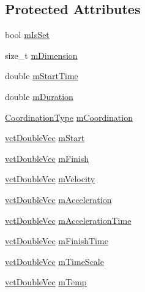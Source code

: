 \subsection*{Protected Attributes}
\begin{DoxyCompactItemize}
\item 
bool \hyperlink{classrob_l_s_p_b_a754306ed9e75319fdd5752dc564b1b85}{m\+Is\+Set}
\item 
size\+\_\+t \hyperlink{classrob_l_s_p_b_a2975b72bfeba86d33010dd9ea987ef3b}{m\+Dimension}
\item 
double \hyperlink{classrob_l_s_p_b_a8116b0fac995bf253c0f701c7ab7a00b}{m\+Start\+Time}
\item 
double \hyperlink{classrob_l_s_p_b_a79217b19223e3b08ca514250ce67bc4d}{m\+Duration}
\item 
\hyperlink{classrob_l_s_p_b_a8feec61f7c94670dbdbe75e63dec8496}{Coordination\+Type} \hyperlink{classrob_l_s_p_b_ade268d2bf36ea69e308acc6e60eeca91}{m\+Coordination}
\item 
\hyperlink{vct_dynamic_vector_types_8h_ade4b3068c86fb88f41af2e5187e491c2}{vct\+Double\+Vec} \hyperlink{classrob_l_s_p_b_ab1ad2d98754f2e0461f7853997293ea5}{m\+Start}
\item 
\hyperlink{vct_dynamic_vector_types_8h_ade4b3068c86fb88f41af2e5187e491c2}{vct\+Double\+Vec} \hyperlink{classrob_l_s_p_b_add5bdcfe3d89555a15bb2741c63ade5a}{m\+Finish}
\item 
\hyperlink{vct_dynamic_vector_types_8h_ade4b3068c86fb88f41af2e5187e491c2}{vct\+Double\+Vec} \hyperlink{classrob_l_s_p_b_a57058d6e24b9b68cd3b2327c5c523eb4}{m\+Velocity}
\item 
\hyperlink{vct_dynamic_vector_types_8h_ade4b3068c86fb88f41af2e5187e491c2}{vct\+Double\+Vec} \hyperlink{classrob_l_s_p_b_a8526c72ab0442d86ed6abcd6772aaf02}{m\+Acceleration}
\item 
\hyperlink{vct_dynamic_vector_types_8h_ade4b3068c86fb88f41af2e5187e491c2}{vct\+Double\+Vec} \hyperlink{classrob_l_s_p_b_af5da64a23030f4447e9e107a2f4e314a}{m\+Acceleration\+Time}
\item 
\hyperlink{vct_dynamic_vector_types_8h_ade4b3068c86fb88f41af2e5187e491c2}{vct\+Double\+Vec} \hyperlink{classrob_l_s_p_b_aa1e0ff251a01dca4a598caa294e2166d}{m\+Finish\+Time}
\item 
\hyperlink{vct_dynamic_vector_types_8h_ade4b3068c86fb88f41af2e5187e491c2}{vct\+Double\+Vec} \hyperlink{classrob_l_s_p_b_aa239e468d4cd7628eda3dd9a799c1742}{m\+Time\+Scale}
\item 
\hyperlink{vct_dynamic_vector_types_8h_ade4b3068c86fb88f41af2e5187e491c2}{vct\+Double\+Vec} \hyperlink{classrob_l_s_p_b_a5fdcfe010bf035e87654f2cd15e07d96}{m\+Temp}
\end{DoxyCompactItemize}


